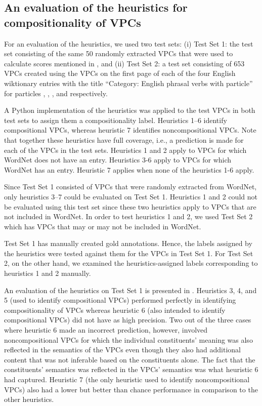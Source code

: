 \documentclass[output=paper,modfonts,nonflat]{langsci/langscibook}
\begin{document}
\subsection{An evaluation of the heuristics for compositionality of VPCs} \label{sec:eval}

For an evaluation of the heuristics, we used two test sets: (i) Test Set 1: the test set consisting of the same 50 randomly extracted VPCs that were used to calculate  scores mentioned in , and (ii) Test Set 2: a test set consisting of 653 VPCs created using the VPCs on the first page of each of the four English wiktionary entries with the title ``Category: English phrasal verbs with particle'' for particles , , , and  respectively.

A Python implementation of the heuristics was applied to the test VPCs in both test sets to assign them a compositionality label. Heuristics 1--6 identify compositional VPCs, whereas heuristic 7 identifies noncompositional VPCs. Note that together these heuristics have full coverage, i.e., a prediction is made for each of the VPCs in the test sets. Heuristics 1 and 2 apply to VPCs for which WordNet does not have an entry.  Heuristics 3-6 apply to VPCs for which WordNet has an entry. Heuristic 7 applies when none of the heuristics 1-6 apply.

Since Test Set 1 consisted of VPCs that were randomly extracted from WordNet, only heuristics 3--7 could be evaluated on Test Set 1. Heuristics 1 and 2 could not be evaluated using this test set since these two heuristics apply to VPCs that are not included in WordNet. In order to test heuristics 1 and 2, we used Test Set 2 which has VPCs that may or may not be included in WordNet. 

Test Set 1 has manually created gold annotations. Hence, the labels assigned by the heuristics were tested against them 
for the VPCs in Test Set 1. For Test Set 2, on the other hand, we examined the heuristics-assigned labels corresponding to heuristics 1 and 2 manually. 
 

An evaluation of the heuristics on Test Set 1 is presented in . Heuristics 3, 4, and 5 (used to identify compositional VPCs) performed perfectly in identifying compositionality of VPCs whereas heuristic 6 (also intended to identify compositional VPCs) did not have as high precision. Two out of the three cases where heuristic 6 made an incorrect prediction, however, involved noncompositional VPCs for which the individual constituents' meaning was also reflected in the semantics of the VPCs even though they also had additional content that was not inferable based on the constituents alone. The fact that the constituents' semantics was reflected in the VPCs' semantics was what heuristic 6 had captured. Heuristic 7 (the only heuristic used to identify noncompositional VPCs) also had a lower but better than chance performance in comparison to the other heuristics. 
\end{document}
